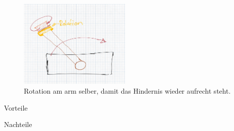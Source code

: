 \paragraph{}
\begin{figure}[h!]
        \centering
        \includegraphics[width=0.48\textwidth]{img/technologierecherche/Rotation/ueberkopf_griff_gelagert.jpg}
        \caption{Rotation am arm selber, damit das Hindernis wieder aufrecht steht.}
        \label{img:tech_ueberkopf_griff_gelagert}
\end{figure}
\begin{minipage}[t]{0.48\textwidth}
    \begin{items}
          \item [Vorteile]
          \item 
          \item 
    \end{items}
\end{minipage}
\hfill
\begin{minipage}[t]{0.48\textwidth}
    \begin{items}
          \item [Nachteile]
          \item 
          \item
          \item 
          \item 
    \end{items}
\end{minipage}
